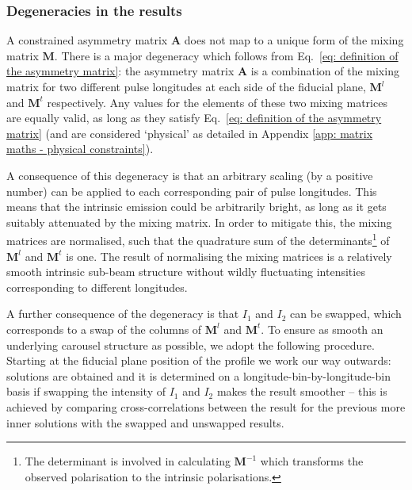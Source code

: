 



\subsubsection{Degeneracies in the results}
\label{sec: B0031 - methods - calculating intrinsic emission - degeneracies}

A constrained asymmetry matrix $\mathbf{A}$ does not map to a unique form of the mixing matrix $\mathbf{M}$. There is a major degeneracy which follows from Eq.~\eqref{eq: definition of the asymmetry matrix}: the asymmetry matrix $\mathbf{A}$ is a combination of the mixing matrix for two different pulse longitudes at each side of the fiducial plane, $\mathbf{M}^l$ and $\mathbf{M}^t$ respectively. Any values for the elements of these two mixing matrices are equally valid, as long as they satisfy Eq.~\eqref{eq: definition of the asymmetry matrix} (and are considered `physical' as detailed in Appendix \ref{app: matrix maths - physical constraints}). 

A consequence of this degeneracy is that an arbitrary scaling (by a positive number) can be applied to each corresponding pair of pulse longitudes. This means that the intrinsic emission could be arbitrarily bright, as long as it gets suitably attenuated by the mixing matrix. In order to mitigate this, the mixing matrices are normalised, such that the quadrature sum of the determinants\footnote{The determinant is involved in calculating $\mathbf{M}^{-1}$ which transforms the observed polarisation to the intrinsic polarisations.} of $\mathbf{M}^l$ and $\mathbf{M}^t$ is one. The result of normalising the mixing matrices is a relatively smooth intrinsic sub-beam structure without wildly fluctuating intensities corresponding to different longitudes.

A further consequence of the degeneracy is that $I_1$ and $I_2$ can be swapped, which corresponds to a swap of the columns of $\mathbf{M}^l$ and $\mathbf{M}^t$. To ensure as smooth an underlying carousel structure as possible, we adopt the following procedure. Starting at the fiducial plane position of the profile we work our way outwards: solutions are obtained and it is determined on a longitude-bin-by-longitude-bin basis if swapping the intensity of $I_1$ and $I_2$ makes the result smoother -- this is achieved by comparing cross-correlations between the result for the previous more inner solutions with the swapped and unswapped results.







